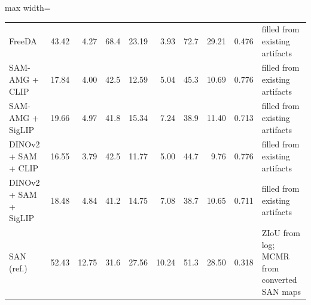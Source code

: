 \begin{table}[t]
\begin{adjustbox}{max width=\textwidth}
\begin{tabular}{lrrrrrrrrp{}}
FreeDA & 43.42 & 4.27 & 68.4 & 23.19 & 3.93 & 72.7 & 29.21 & 0.476 & filled from existing artifacts \\
SAM-AMG + CLIP & 17.84 & 4.00 & 42.5 & 12.59 & 5.04 & 45.3 & 10.69 & 0.776 & filled from existing artifacts \\
SAM-AMG + SigLIP & 19.66 & 4.97 & 41.8 & 15.34 & 7.24 & 38.9 & 11.40 & 0.713 & filled from existing artifacts \\
DINOv2 + SAM + CLIP & 16.55 & 3.79 & 42.5 & 11.77 & 5.00 & 44.7 & 9.76 & 0.776 & filled from existing artifacts \\
DINOv2 + SAM + SigLIP & 18.48 & 4.84 & 41.2 & 14.75 & 7.08 & 38.7 & 10.65 & 0.711 & filled from existing artifacts \\
SAN (ref.) & 52.43 & 12.75 & 31.6 & 27.56 & 10.24 & 51.3 & 28.50 & 0.318 & ZIoU from log; MCMR from converted SAN maps \\
\bottomrule
\end{tabular}
\end{adjustbox}
\end{table}
